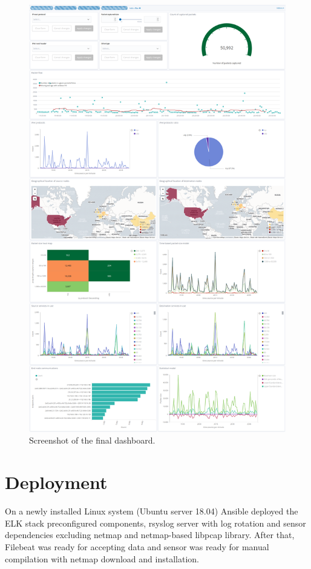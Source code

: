 \documentclass[12pt,a4paper,twoside]{book}
\begin{document}
        \begin{figure}
            \centering
            \includegraphics[scale=0.2]{final_dashboard}
            \caption{Screenshot of the final dashboard.}
            \label{figure:dashboard}
        \end{figure}
    \section{Deployment}
        On a newly installed Linux system (Ubuntu server 18.04) Ansible deployed the ELK stack preconfigured components, rsyslog server with log rotation and sensor dependencies excluding netmap and netmap-based libpcap library. After that, Filebeat was ready for accepting data and sensor was ready for manual compilation with netmap download and installation.
\end{document}
